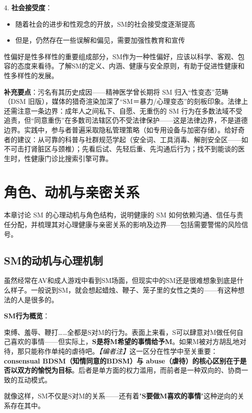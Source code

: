 \documentclass[12pt,UTF8]{ctexbook}
\begin{document}
4. \textbf{社会接受度}：
  \begin{itemize}
  \item 随着社会的进步和性观念的开放，SM的社会接受度逐渐提高
  \item 但是，仍然存在一些误解和偏见，需要加强性教育和宣传
  \end{itemize}

性偏好是性多样性的重要组成部分，SM作为一种性偏好，应该以科学、客观、包容的态度来看待。了解SM的定义、内涵、健康与安全原则，有助于促进性健康和性多样性的发展。

\noindent\textbf{补充要点}：污名有其历史成因——精神医学曾长期将 SM 归入“性变态”范畴（DSM 旧版），媒体的猎奇渲染加深了“SM＝暴力/心理变态”的刻板印象。法律上还需注意一条边界：成年人之间私下、自愿、无重伤的 SM 行为在多数法域不受追责，但“同意重伤”在多数司法辖区仍不受法律保护——这是法律边界，不是道德边界。实践中，参与者普遍采取隐私管理策略（如专用设备与加密存储）。给好奇者的建议：从可靠的科普与社群规范学起（安全词、工具消毒、解剖安全区——如不可击打肾脏区与颈椎）；先看后试、先轻后重、先沟通后行为；找不到能谈的医生时，性健康门诊比搜索引擎可靠。

\chapter{角色、动机与亲密关系}

本章讨论 SM 的心理动机与角色结构，说明健康的 SM 如何依赖沟通、信任与责任分配，并梳理其对心理健康与亲密关系的影响及边界——包括需要警惕的风险信号。

\section{SM的动机与心理机制}

虽然经常在AV和成人游戏中看到SM场面，但现实中的SM还是很难想象到底是什么样子。一般说到SM，就会想起蜡烛、鞭子、笼子里的女性之类的——有这种想法的人是很多的。

\noindent\textbf{SM行为概览}：

束缚、羞辱、鞭打……全都是S对M的行为。表面上来看，S可以肆意对M做任何自己喜欢的事情——但实际上，\textbf{S是将M希望的事情给予M}。如果M被对方胡乱地对待，那只能称作单纯的虐待吧。\textit{【编者注】}这一区分在性学中至关重要：\textbf{consensual BDSM（知情同意的BDSM）与 abuse（虐待）的核心区别在于是否以双方的愉悦为目标}。后者是单方面的权力滥用，而前者是一种双向的、协商一致的互动模式。

就像这样，SM不仅是S对M的关系——还有着"\textbf{S要做M喜欢的事情}"这种逆向的关系存在其中。
\end{document}
